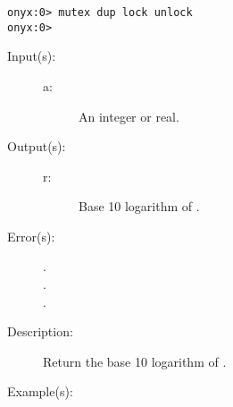 \begin{description}
\begin{description}
\begin{verbatim}
onyx:0> mutex dup lock unlock
onyx:0>
		\end{verbatim}
	\end{description}
\label{systemdict:log}
\item[{\onyxop{a}{log}{r}}: ]
	\begin{description}\item[]
	\item[Input(s): ]
		\begin{description}\item[]
		\item[a: ]
			An integer or real.
		\end{description}
	\item[Output(s): ]
		\begin{description}\item[]
		\item[r: ]
			Base 10 logarithm of .
		\end{description}
	\item[Error(s): ]
		\begin{description}\item[]
		\item[.]
		\item[.]
		\item[.]
		\end{description}
	\item[Description: ]
		Return the base 10 logarithm of .
	\item[Example(s): ]\begin{verbatim}


\end{verbatim}
\end{description}
\end{description}
